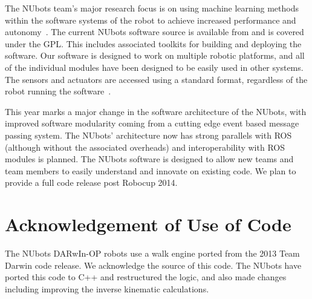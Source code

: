 \documentclass{llncs}
\begin{document}

The NUbots team's major research focus is on using machine learning methods within the software systems of the robot to achieve increased performance and autonomy~\cite{ChalupEtAlSMC2007}. The current NUbots software source is available from \cite{nubotsGit} and is covered under the GPL. This includes associated toolkits for building and deploying the software. Our software is designed to work on multiple robotic platforms, and all of the individual modules have been designed to be easily used in other systems. The sensors and actuators are accessed using a standard format, regardless of the robot running the software~\cite{Kulk2011c}.

This year marks a major change in the software architecture of the NUbots, with improved software modularity coming from a cutting edge event based message passing system. The NUbots' architecture now has strong parallels with ROS (although without the associated overheads) and interoperability with ROS modules is planned. The NUbots software is designed to allow new teams and team members to easily understand and innovate on existing code. We plan to provide a full code release post Robocup 2014.




\section{Acknowledgement of Use of Code}
The NUbots DARwIn-OP robots use a walk engine ported from the 2013 Team Darwin code release. We acknowledge the source of this code. The NUbots have ported this code to C++ and restructured the logic, and also made changes including improving the inverse kinematic calculations. %
\end{document}

